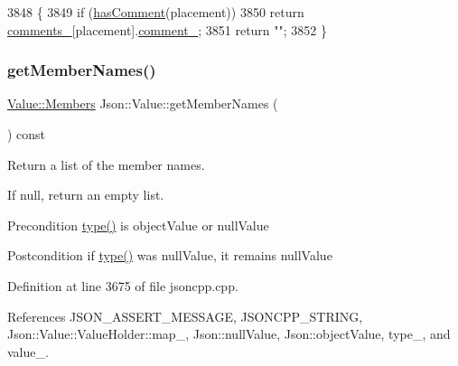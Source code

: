 \begin{DoxyCode}
3848                                                                  \{
3849   \textcolor{keywordflow}{if} (\hyperlink{class_json_1_1_value_a65d8e3ab6a5871cbd019a3e0f0b944a3}{hasComment}(placement))
3850     \textcolor{keywordflow}{return} \hyperlink{class_json_1_1_value_a2016564cabc7a29208e97bd0b782a4e4}{comments\_}[placement].\hyperlink{struct_json_1_1_value_1_1_comment_info_a020f19c7098bab8ec8fec14cd1a5afb9}{comment\_};
3851   \textcolor{keywordflow}{return} \textcolor{stringliteral}{""};
3852 \}
\end{DoxyCode}
\mbox{\label{class_json_1_1_value_a79d7725dce6260317333e69022367ac9}} 
\subsubsection{\texorpdfstring{get\+Member\+Names()}{getMemberNames()}}
{\footnotesize\ttfamily \hyperlink{class_json_1_1_value_a9ae9069983fc38f1928d76f9c79ac64d}{Value\+::\+Members} Json\+::\+Value\+::get\+Member\+Names (\begin{DoxyParamCaption}{ }\end{DoxyParamCaption}) const}



Return a list of the member names. 

If null, return an empty list. \begin{DoxyPrecond}{Precondition}
\hyperlink{class_json_1_1_value_a8ce61157a011894f0252ceed232312de}{type()} is object\+Value or null\+Value 
\end{DoxyPrecond}
\begin{DoxyPostcond}{Postcondition}
if \hyperlink{class_json_1_1_value_a8ce61157a011894f0252ceed232312de}{type()} was null\+Value, it remains null\+Value 
\end{DoxyPostcond}


Definition at line 3675 of file jsoncpp.\+cpp.



References J\+S\+O\+N\+\_\+\+A\+S\+S\+E\+R\+T\+\_\+\+M\+E\+S\+S\+A\+GE, J\+S\+O\+N\+C\+P\+P\+\_\+\+S\+T\+R\+I\+NG, Json\+::\+Value\+::\+Value\+Holder\+::map\+\_\+, Json\+::null\+Value, Json\+::object\+Value, type\+\_\+, and value\+\_\+.



